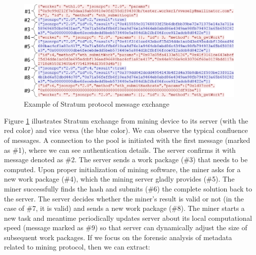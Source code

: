 \documentclass[preprint,12pt,3p]{elsarticle}
\begin{document}
\begin{figure}[ht]
    \centering
    \includegraphics[width=\textwidth]{exchange.png}
    \caption{Example of Stratum protocol message exchange}
    \label{fig:stratum}
\end{figure}

Figure \ref{fig:stratum} illustrates Stratum exchange from mining device to its server (with the red color) and vice versa (the blue color). We can observe the typical confluence of messages. A connection to the pool is initiated with the first message (marked as \#1), where we can see authentication details. The server confirms it with message denoted as \#2. The server sends a work package (\#3) that needs to be computed. Upon proper initialization of mining software, the miner asks for a new work package (\#4), which the mining server gladly provides (\#5). The miner successfully finds the hash and submits (\#6) the complete solution back to the server. The server decides whether the miner's result is valid or not (in the case of \#7, it is valid) and sends a new work package (\#8). The miner starts a new task and meantime periodically updates server about its local computational speed (message marked as \#9) so that server can dynamically adjust the size of subsequent work packages. 
If we focus on the forensic analysis of metadata related to mining protocol, then we can extract:
\end{document}
